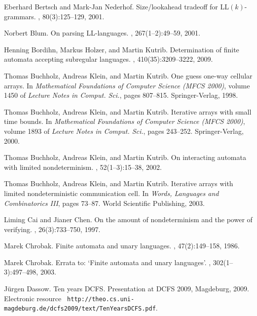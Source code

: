 \documentclass[copyright]{eptcs}
\begin{document}
 \begin{thebibliography}{10}

Eberhard Bertsch and Mark-Jan Nederhof.
\newblock Size/lookahead tradeoff for {L}{L}$(k)$-grammars.
, 80(3):125--129, 2001.

Norbert Blum.
\newblock On parsing {L}{L}-languages.
, 267(1--2):49--59, 2001.

Henning Bordihn, Markus Holzer, and Martin Kutrib.
\newblock Determination of finite automata accepting subregular languages.
, 410(35):3209--3222, 2009.

Thomas Buchholz, Andreas Klein, and Martin Kutrib.
\newblock One guess one-way cellular arrays.
\newblock In {\em Mathematical Foundations of Computer Science ({MFCS} 2000)},
  volume 1450 of {\em Lecture Notes in Comput. Sci.}, pages 807--815.
  Springer-Verlag, 1998.

Thomas Buchholz, Andreas Klein, and Martin Kutrib.
\newblock Iterative arrays with small time bounds.
\newblock In {\em Mathematical Foundations of Computer Science ({MFCS} 2000)},
  volume 1893 of {\em Lecture Notes in Comput. Sci.}, pages 243--252.
  Springer-Verlag, 2000.

Thomas Buchholz, Andreas Klein, and Martin Kutrib.
\newblock On interacting automata with limited nondeterminism.
, 52(1--3):15--38, 2002.

Thomas Buchholz, Andreas Klein, and Martin Kutrib.
\newblock Iterative arrays with limited nondeterministic communication cell.
\newblock In {\em Words, Languages and Combinatorics III}, pages 73--87. World
  Scientific Publishing, 2003.

Liming Cai and Jianer Chen.
\newblock On the amount of nondeterminism and the power of verifying.
, 26(3):733--750, 1997.

Marek Chrobak.
\newblock Finite automata and unary languages.
, 47(2):149--158, 1986.

Marek Chrobak.
\newblock Errata to: `{F}inite automata and unary languages'.
, 302(1--3):497--498, 2003.

J{\"u}rgen Dassow.
\newblock Ten years {DCFS}.
\newblock Presentation at DCFS 2009, Magdeburg, 2009. Electronic resource {\tt
  http://theo.cs.uni-magdeburg.de/dcfs2009/text/TenYearsDCFS.pdf}.


\end{thebibliography}
\end{document}
